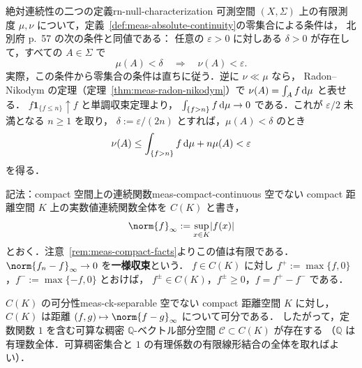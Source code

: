 \begin{remark}{絶対連続性の二つの定義}{rn-null-characterization}
  可測空間 $(X,\Sigma)$ 上の有限測度 $\mu,\nu$ について，定義~\ref{def:meas-absolute-continuity}の零集合による条件は，
  北別府 p.~57 の次の条件と同値である：
  任意の $\varepsilon>0$ に対しある $\delta>0$ が存在して，すべての $A\in\Sigma$ で
  \[
    \mu(A)<\delta\quad\Longrightarrow\quad\nu(A)<\varepsilon.
  \]
  実際，この条件から零集合の条件は直ちに従う．逆に $\nu\ll\mu$ なら，
  Radon--Nikodym の定理（定理~\ref{thm:meas-radon-nikodym}）で $\nu(A)=\int_Af\,\mathrm{d}\mu$ と表せる．
  $f\mathbf{1}_{\{f\leq n\}}\uparrow f$ と単調収束定理より，
  $\int_{\{f>n\}}f\,\mathrm{d}\mu\to0$ である．これが $\varepsilon/2$ 未満となる $n\geq1$ を取り，
  $\delta:=\varepsilon/(2n)$ とすれば，$\mu(A)<\delta$ のとき
  \[
    \nu(A)\leq\int_{\{f>n\}}f\,\mathrm{d}\mu+n\mu(A)<\varepsilon
  \]
  を得る．
\end{remark}

\begin{remark}{記法：compact 空間上の連続関数}{meas-compact-continuous}
  空でない compact 距離空間 $K$ 上の実数値連続関数全体を $C(K)$ と書き，
  \[
    \norm{f}_\infty:=\sup_{x\in K}\abs{f(x)}
  \]
  とおく．注意~\ref{rem:meas-compact-facts}よりこの値は有限である．
  $\norm{f_n-f}_\infty\to0$ を\textbf{一様収束}という．
  $f\in C(K)$ に対し $f^+:=\max\{f,0\}$，$f^-:=\max\{-f,0\}$ とおけば，
  $f^\pm\in C(K)$，$f^\pm\geq0$，$f=f^+-f^-$ である．
\end{remark}

\begin{theorem}{$C(K)$ の可分性}{meas-ck-separable}
  空でない compact 距離空間 $K$ に対し，$C(K)$ は距離
  $(f,g)\mapsto\norm{f-g}_\infty$ について可分である．
  したがって，定数関数 $1$ を含む可算な稠密 $\mathbb{Q}$-ベクトル部分空間
  $\mathcal{C}\subset C(K)$ が存在する
  （$\mathbb{Q}$ は有理数全体．可算稠密集合と $1$ の有理係数の有限線形結合の全体を取ればよい）．

\end{theorem}


